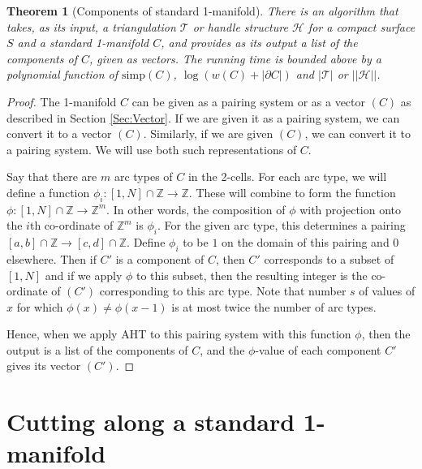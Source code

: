 \documentclass[oneside]{amsart}
\numberwithin{equation}{section}
\theoremstyle{plain}
\newtheorem{theorem}[equation]{Theorem}
\newtheorem{lemma}[equation]{Lemma}
\theoremstyle{definition}
\newcommand{\calT}{{\mathcal{T}}}
\newcommand{\cut}{\backslash\backslash}
\newcommand{\calH}{\mathcal{H}}
\begin{document}
\begin{theorem}[{\sc Components of standard 1-manifold}]
\label{Thm:ComponentsCurves}
There is an algorithm that takes, as its input, a triangulation $\calT$ or handle structure $\calH$ for a compact surface $S$ and a standard 1-manifold $C$, and provides as its output a list of the components of $C$, given as vectors. The running time is bounded above by a polynomial function of $\mathrm{simp}(C)$, $\log (w(C) + |\partial C|)$ and $|\calT|$ or $||\calH||$. 
\end{theorem}

\begin{proof} The 1-manifold $C$ can be given as a pairing system or as a vector $(C)$ as described in Section \ref{Sec:Vector}. If we are given it as a pairing system, we can convert it to a vector $(C)$. Similarly, if we are given $(C)$, we can convert it to a pairing system. We will use both such representations of $C$.

Say that there are $m$ arc types of $C$ in the 2-cells. For each arc type, we will define a function $\phi_i \colon [1,N] \cap \mathbb{Z} \rightarrow \mathbb{Z}$. These will combine to form the function $\phi \colon [1,N] \cap \mathbb{Z} \rightarrow \mathbb{Z}^m$. In other words, the composition of $\phi$ with projection onto the $i$th co-ordinate of $\mathbb{Z}^m$ is $\phi_i$. For the given arc type, this determines a pairing $[a,b] \cap \mathbb{Z} \rightarrow [c,d] \cap \mathbb{Z}$. Define $\phi_i$ to be $1$ on the domain of this pairing and $0$ elsewhere. Then if $C'$ is a component of $C$, then $C'$ corresponds to a subset of $[1,N]$ and if we apply $\phi$ to this subset, then the resulting integer is the co-ordinate of $(C')$ corresponding to this arc type. Note that number $s$ of values of $x$ for which $\phi(x) \not= \phi(x-1)$ is at most twice the number of arc types.

Hence, when we apply {\sc AHT} to this pairing system with this function $\phi$, then the output is a list of the components of $C$, and the $\phi$-value of each component $C'$ gives its vector $(C')$. \end{proof}

\section{Cutting along a standard 1-manifold}
\label{Sec:Cut}

\end{document}

